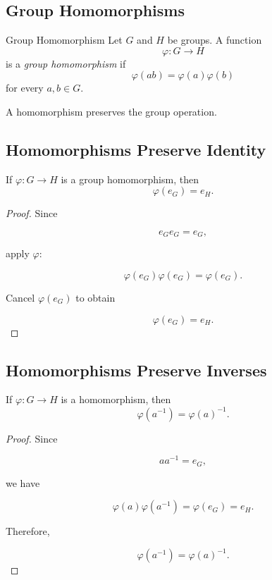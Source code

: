 \subsection{Group Homomorphisms}
\label{subsec:group-homomorphisms}

\begin{definitionbox}{Group Homomorphism}
Let \(G\) and \(H\) be groups. A function
\[ \varphi:G\to H \]
is a \emph{group homomorphism} if
\[ \varphi(ab)=\varphi(a)\varphi(b) \]
for every \(a,b\in G\).
\end{definitionbox}

A homomorphism preserves the group operation.

\subsection{Homomorphisms Preserve Identity}
\label{subsec:homomorphism-identity}

\begin{theorem}
If \(\varphi:G\to H\) is a group homomorphism, then
\[ \varphi(e_G)=e_H. \]
\end{theorem}

\begin{proof}
Since

\[ e_Ge_G=e_G, \]

apply \(\varphi\):

\[ \varphi(e_G)\varphi(e_G)=\varphi(e_G). \]

Cancel \(\varphi(e_G)\) to obtain

\[ \varphi(e_G)=e_H. \]
\end{proof}

\subsection{Homomorphisms Preserve Inverses}
\label{subsec:homomorphism-inverses}

\begin{theorem}
If \(\varphi:G\to H\) is a homomorphism, then
\[ \varphi(a^{-1})=\varphi(a)^{-1}. \]
\end{theorem}

\begin{proof}
Since

\[ aa^{-1}=e_G, \]

we have

\[ \varphi(a)\varphi(a^{-1})=\varphi(e_G)=e_H. \]

Therefore,

\[ \varphi(a^{-1})=\varphi(a)^{-1}. \]
\end{proof}

